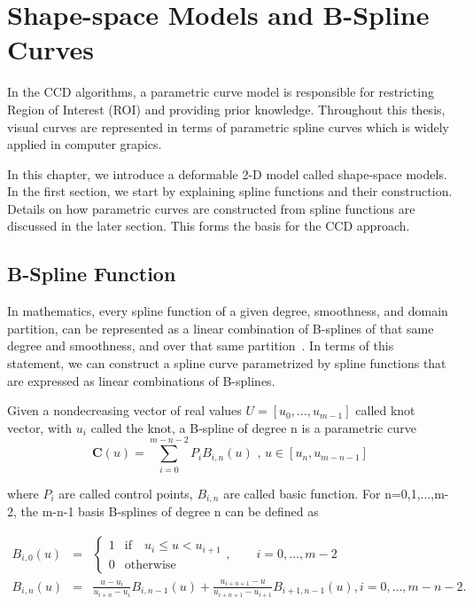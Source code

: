 \chapter{Shape-space Models and B-Spline Curves}
\label{chapter:bspline}
In the CCD algorithms, a parametric curve model is responsible for
restricting Region of Interest (ROI) and providing prior knowledge. 
Throughout this thesis, visual curves are represented in terms of
parametric spline curves which is widely applied in computer grapics.

In this chapter, we introduce a deformable 2-D model called
shape-space models.  In the first section, we start by explaining
spline functions and their construction. Details on how parametric
curves are constructed from spline functions are discussed in the
later section. This forms the basis for the CCD approach.
\section{B-Spline Function}
\label{sec:bsc}
In mathematics, every spline function of a given degree,
smoothness, and domain partition, can be represented as a linear
combination of B-splines of that same degree and smoothness, and over
that same partition~\cite{press2007numerical}. In terms of this statement, we can
construct  a spline curve parametrized by spline functions that are
expressed as linear combinations of B-splines. 

Given a nondecreasing vector of real values $U = [u_0, \ldots,
u_{m-1}]$ called knot vector, with $u_i$ called the knot, a
B-spline of degree n is a parametric curve
\begin{equation}
  \label{eq:4.1}
  \mathbf{C}(u) =  \sum_{i=0}^{m-n-2} P_{i} B_{i,n}(u) \mbox{ , } u \in [u_{n},u_{m-n-1}]
\end{equation}

where $P_i$ are called control points, $B_{i,n}$ are called
basic function. For n=0,1,...,m-2, the m-n-1 basis B-splines of degree
n can be defined as 

\begin{eqnarray}
  \label{eq:4.2}
  B_{i,0}(u) &=&  \left\{
\begin{matrix} 
1 & \mathrm{if} \quad u_i \leq u < u_{i+1} \\
0 & \mathrm{otherwise} 
\end{matrix}
\right.,\qquad i=0,\ldots, m{-}2 \nonumber\\
B_{i,n}(u) &=& \frac{u - u_i}{u_{i+n} - u_i} B_{i,n-1}(u) + \frac{u_{i+n+1} - u}{u_{i+n+1} - u_{i+1}} B_{i+1,n-1}(u)
, i=0,\ldots, m{-}n{-}2.  
\end{eqnarray}

